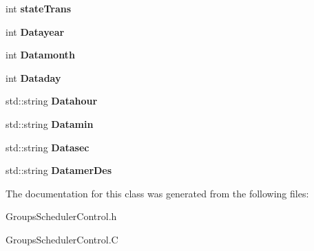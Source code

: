 \begin{DoxyCompactItemize}
\item 
int {\bfseries state\+Trans}\hypertarget{classGroupsSchedulerControlWidget_a4432bfb83864771828fc7737e6036f70}{}\label{classGroupsSchedulerControlWidget_a4432bfb83864771828fc7737e6036f70}

\item 
int {\bfseries Datayear}\hypertarget{classGroupsSchedulerControlWidget_a66ec7faf37c92c1f03c1bb4596cc3d35}{}\label{classGroupsSchedulerControlWidget_a66ec7faf37c92c1f03c1bb4596cc3d35}

\item 
int {\bfseries Datamonth}\hypertarget{classGroupsSchedulerControlWidget_a8122a727dcb1fecf4024e24c005cf557}{}\label{classGroupsSchedulerControlWidget_a8122a727dcb1fecf4024e24c005cf557}

\item 
int {\bfseries Dataday}\hypertarget{classGroupsSchedulerControlWidget_a7c82db58f89050af2218d34e5b33cf8b}{}\label{classGroupsSchedulerControlWidget_a7c82db58f89050af2218d34e5b33cf8b}

\item 
std\+::string {\bfseries Datahour}\hypertarget{classGroupsSchedulerControlWidget_adbc8d45964535dc6673cf09eecf85c39}{}\label{classGroupsSchedulerControlWidget_adbc8d45964535dc6673cf09eecf85c39}

\item 
std\+::string {\bfseries Datamin}\hypertarget{classGroupsSchedulerControlWidget_a89db2576a184aa1b35a99905eed3cfe3}{}\label{classGroupsSchedulerControlWidget_a89db2576a184aa1b35a99905eed3cfe3}

\item 
std\+::string {\bfseries Datasec}\hypertarget{classGroupsSchedulerControlWidget_ae4cf032cf6447ca4a8a04eae4822c939}{}\label{classGroupsSchedulerControlWidget_ae4cf032cf6447ca4a8a04eae4822c939}

\item 
std\+::string {\bfseries Datamer\+Des}\hypertarget{classGroupsSchedulerControlWidget_a4b11331ab0f81e4f3a9bcb950950ee8e}{}\label{classGroupsSchedulerControlWidget_a4b11331ab0f81e4f3a9bcb950950ee8e}

\end{DoxyCompactItemize}


The documentation for this class was generated from the following files\+:\begin{DoxyCompactItemize}
\item 
Groups\+Scheduler\+Control.\+h\item 
Groups\+Scheduler\+Control.\+C\end{DoxyCompactItemize}
